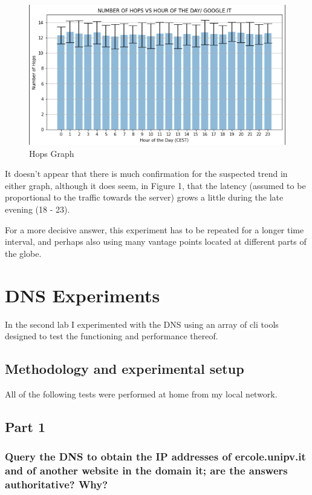 \documentclass[a4paper,10pt]{article}
\begin{document}
\begin{figure}[h!]
\centering
\includegraphics[scale=0.4]{hops_graph}
\caption{Hops Graph}
\label{fig:hops_graph}
\end{figure}


It doesn't appear that there is much confirmation for the suspected trend in either graph, although it does seem, in Figure 1, that the latency (assumed to be proportional to the traffic towards the server) grows a little during the late evening (18 - 23).

For a more decisive answer, this experiment has to be repeated for a longer time interval, and perhaps also using many vantage points located at different parts of the globe.

\section{DNS Experiments}
In the second lab I experimented with the DNS using an array of cli tools designed to test the functioning and performance thereof.
\subsection{Methodology and experimental setup}
All of the following tests were performed at home from my local network.

\subsection{Part 1}


\subsubsection{Query the DNS to obtain the IP addresses of ercole.unipv.it and of another website in the domain it; are the answers authoritative? Why?}
\end{document}

